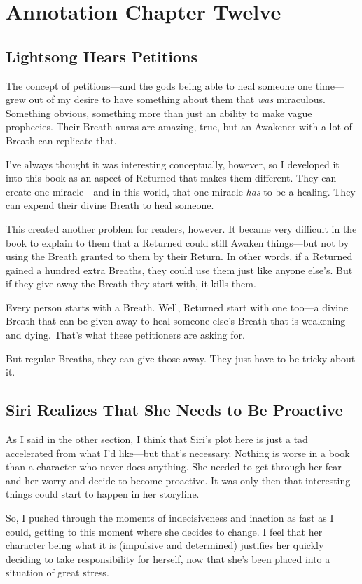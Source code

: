 \section{Annotation Chapter Twelve}

\subsection*{Lightsong Hears Petitions}

The concept of petitions—and the gods being able to heal someone one time—grew out of my desire to have something about them that \textit{was} miraculous. Something obvious, something more than just an ability to make vague prophecies. Their Breath auras are amazing, true, but an Awakener with a lot of Breath can replicate that.



I’ve always thought it was interesting conceptually, however, so I developed it into this book as an aspect of Returned that makes them different. They can create one miracle—and in this world, that one miracle \textit{has} to be a healing. They can expend their divine Breath to heal someone.

This created another problem for readers, however. It became very difficult in the book to explain to them that a Returned could still Awaken things—but not by using the Breath granted to them by their Return. In other words, if a Returned gained a hundred extra Breaths, they could use them just like anyone else’s. But if they give away the Breath they start with, it kills them.

Every person starts with a Breath. Well, Returned start with one too—a divine Breath that can be given away to heal someone else’s Breath that is weakening and dying. That’s what these petitioners are asking for.

But regular Breaths, they can give those away. They just have to be tricky about it.

\subsection*{Siri Realizes That She Needs to Be Proactive}

As I said in the other section, I think that Siri’s plot here is just a tad accelerated from what I’d like—but that’s necessary. Nothing is worse in a book than a character who never does anything. She needed to get through her fear and her worry and decide to become proactive. It was only then that interesting things could start to happen in her storyline.

So, I pushed through the moments of indecisiveness and inaction as fast as I could, getting to this moment where she decides to change. I feel that her character being what it is (impulsive and determined) justifies her quickly deciding to take responsibility for herself, now that she’s been placed into a situation of great stress.



